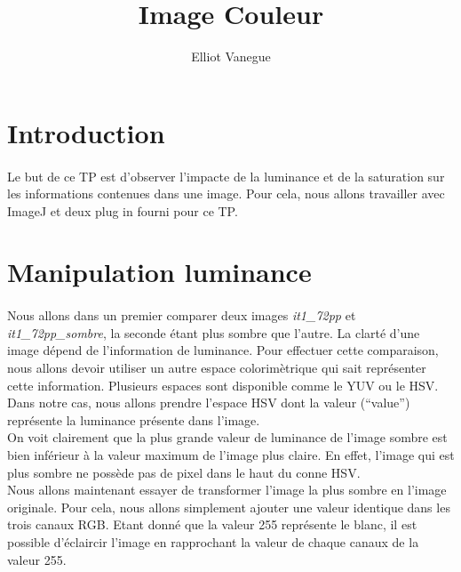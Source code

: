 \documentclass[a4paper,10pt]{article}
\title{Image Couleur}
\author{Elliot Vanegue}
\begin{document}
\maketitle
\section{Introduction}
\paragraph{}Le but de ce TP est d'observer l'impacte de la luminance et de la saturation sur les informations
contenues dans une image. Pour cela, nous allons travailler avec ImageJ et deux plug in fourni pour
ce TP.

\section{Manipulation luminance}
\paragraph{}Nous allons dans un premier comparer deux images \textit{it1\_72pp} et \textit{it1\_72pp\_sombre}, la seconde étant plus sombre que l'autre.
La clarté d'une image dépend de l'information de luminance.
Pour effectuer cette comparaison, nous allons devoir utiliser un autre espace colorimètrique qui
sait représenter cette information. Plusieurs espaces sont disponible comme le YUV ou le HSV.
Dans notre cas, nous allons prendre l'espace HSV dont la valeur (\enquote{value}) représente 
la luminance présente dans l'image.\\


On voit clairement que la plus grande valeur de luminance de l'image sombre est bien inférieur
à la valeur maximum de l'image plus claire. En effet, l'image qui est plus sombre ne possède pas de pixel dans le haut du conne
HSV.\\

Nous allons maintenant essayer de transformer l'image la plus sombre en l'image originale. Pour cela,
nous allons simplement ajouter une valeur identique dans les trois canaux RGB. Etant donné que la valeur 255
représente le blanc, il est possible d'éclaircir l'image en rapprochant la valeur de chaque canaux de la valeur 255.

\begin{tabular}{|c|c|c|}
 
\end{tabular}
\end{document}
